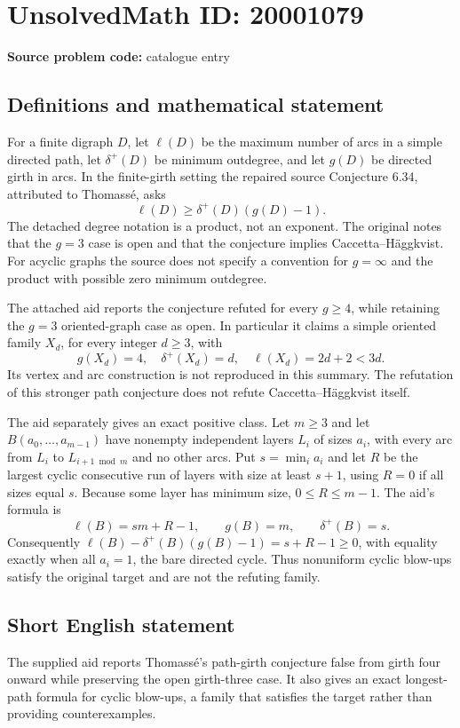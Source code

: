 \documentclass[11pt]{article}
\begin{document}
\section*{UnsolvedMath ID: 20001079}
\textbf{Source problem code:} catalogue entry
\subsection{Definitions and mathematical statement}
For a finite digraph $D$, let $\ell(D)$ be the maximum number of arcs in a simple directed path, let $\delta^+(D)$ be minimum outdegree, and let $g(D)$ be directed girth in arcs. In the finite-girth setting the repaired source Conjecture 6.34, attributed to Thomass\'e, asks
\[
\ell(D)\ge\delta^+(D)(g(D)-1).
\]
The detached degree notation is a product, not an exponent. The original notes that the $g=3$ case is open and that the conjecture implies Caccetta--H\"aggkvist. For acyclic graphs the source does not specify a convention for $g=\infty$ and the product with possible zero minimum outdegree.

The attached aid reports the conjecture refuted for every $g\ge4$, while retaining the $g=3$ oriented-graph case as open. In particular it claims a simple oriented family $X_d$, for every integer $d\ge3$, with
\[
g(X_d)=4,\quad\delta^+(X_d)=d,\quad\ell(X_d)=2d+2<3d.
\]
Its vertex and arc construction is not reproduced in this summary. The refutation of this stronger path conjecture does not refute Caccetta--H\"aggkvist itself.

The aid separately gives an exact positive class. Let $m\ge3$ and let $B(a_0,\ldots,a_{m-1})$ have nonempty independent layers $L_i$ of sizes $a_i$, with every arc from $L_i$ to $L_{i+1\bmod m}$ and no other arcs. Put $s=\min_i a_i$ and let $R$ be the largest cyclic consecutive run of layers with size at least $s+1$, using $R=0$ if all sizes equal $s$. Because some layer has minimum size, $0\le R\le m-1$. The aid's formula is
\[
\ell(B)=sm+R-1,\qquad g(B)=m,\qquad\delta^+(B)=s.
\]
Consequently $\ell(B)-\delta^+(B)(g(B)-1)=s+R-1\ge0$, with equality exactly when all $a_i=1$, the bare directed cycle. Thus nonuniform cyclic blow-ups satisfy the original target and are not the refuting family.
\subsection{Short English statement}
The supplied aid reports Thomass\'e's path-girth conjecture false from girth four onward while preserving the open girth-three case. It also gives an exact longest-path formula for cyclic blow-ups, a family that satisfies the target rather than providing counterexamples.
\end{document}
